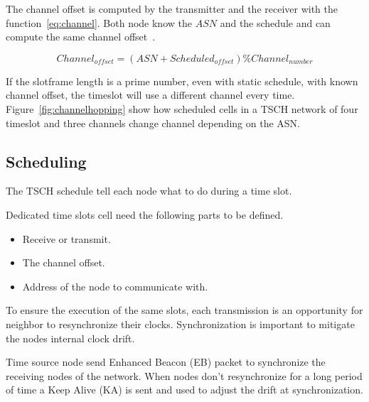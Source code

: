 The channel offset is computed by the transmitter and the receiver with the
function~\ref{eq:channel}. Both node know the $ASN$ and the schedule and can
compute the same channel offset~\cite{rfc7554}.

\begin{equation}
  \label{eq:channel}
  Channel_{offset} = (ASN + Scheduled_{offset}) \% Channel_{number}
\end{equation}

If the slotframe length is a prime number, even with static schedule,
with known channel offset, the timeslot will use a different channel every time.
Figure~\ref{fig:channelhopping} show how scheduled cells in a TSCH network of
four timeslot and three channels change channel depending on the ASN.



\subsection{Scheduling}

The TSCH schedule tell each node what to do during a time slot.

Dedicated time slots cell need the following parts to be defined.

\begin{itemize}
  \item Receive or transmit.
  \item The channel offset.
  \item Address of the node to communicate with.
\end{itemize}


To ensure the execution of the same slots, each transmission is an opportunity 
for neighbor to resynchronize their clocks.
Synchronization is important to mitigate the nodes internal clock drift.

Time source node send Enhanced Beacon (EB) packet to synchronize the receiving
nodes of the network. When nodes don't resynchronize for a long period of time 
a Keep Alive (KA) is sent and used to adjust the drift at synchronization.


